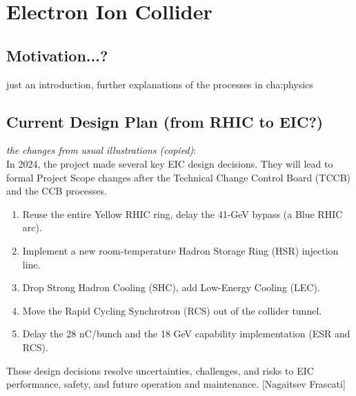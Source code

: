 \chapter{Electron Ion Collider}\label{cha:EIC} %

\section{Motivation...?}
just an introduction, further explanations of the processes in cha:physics

\section{Current Design Plan (from RHIC to EIC?)}

\textit{the changes from usual illustrations (copied)}:\\
In 2024, the project made several key EIC design decisions. They will lead to
formal Project Scope changes after the Technical Change Control Board (TCCB)
and the CCB processes.
\begin{enumerate}[topsep=1mm, itemsep=0mm]
    \item Reuse the entire Yellow RHIC ring, delay the 41-GeV bypass (a Blue RHIC arc).
    \item Implement a new room-temperature Hadron Storage Ring (HSR) injection line.
    \item Drop Strong Hadron Cooling (SHC), add Low-Energy Cooling (LEC).
    \item Move the Rapid Cycling Synchrotron (RCS) out of the collider tunnel.
    \item Delay the 28 nC/bunch and the 18 GeV capability implementation (ESR and RCS).
\end{enumerate}
These design decisions resolve uncertainties, challenges, and risks to EIC
performance, safety, and future operation and maintenance. [Nagaitsev Frascati]


